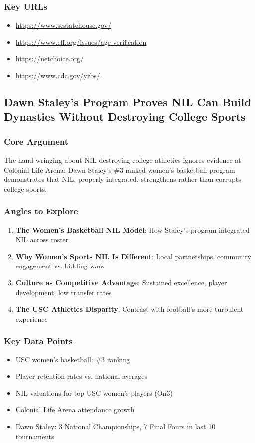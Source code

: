 \documentclass[11pt,letterpaper]{article}
\begin{document}
\subsubsection*{Key URLs}
\begin{itemize}[noitemsep]
    \item \url{https://www.scstatehouse.gov/}
    \item \url{https://www.eff.org/issues/age-verification}
    \item \url{https://netchoice.org/}
    \item \url{https://www.cdc.gov/yrbs/}
\end{itemize}

\newpage
\subsection{Dawn Staley's Program Proves NIL Can Build Dynasties Without Destroying College Sports}

\subsubsection*{Core Argument}
The hand-wringing about NIL destroying college athletics ignores evidence at Colonial Life Arena: Dawn Staley's \#3-ranked women's basketball program demonstrates that NIL, properly integrated, strengthens rather than corrupts college sports.

\subsubsection*{Angles to Explore}
\begin{enumerate}[noitemsep]
    \item \textbf{The Women's Basketball NIL Model}: How Staley's program integrated NIL across roster
    \item \textbf{Why Women's Sports NIL Is Different}: Local partnerships, community engagement vs. bidding wars
    \item \textbf{Culture as Competitive Advantage}: Sustained excellence, player development, low transfer rates
    \item \textbf{The USC Athletics Disparity}: Contrast with football's more turbulent experience
\end{enumerate}

\subsubsection*{Key Data Points}
\begin{itemize}[noitemsep]
    \item USC women's basketball: \#3 ranking
    \item Player retention rates vs. national averages
    \item NIL valuations for top USC women's players (On3)
    \item Colonial Life Arena attendance growth
    \item Dawn Staley: 3 National Championships, 7 Final Fours in last 10 tournaments
\end{itemize}
\end{document}
